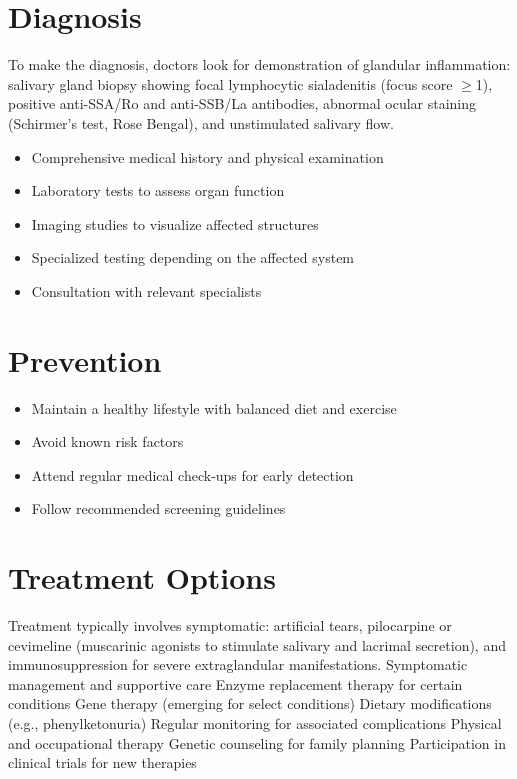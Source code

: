 \section{Diagnosis}
To make the diagnosis, doctors look for demonstration of glandular inflammation: salivary gland biopsy showing focal lymphocytic sialadenitis (focus score $\geq$1), positive anti-SSA/Ro and anti-SSB/La antibodies, abnormal ocular staining (Schirmer's test, Rose Bengal), and unstimulated salivary flow.

\begin{itemize}[noitemsep]
  \item Comprehensive medical history and physical examination
  \item Laboratory tests to assess organ function
  \item Imaging studies to visualize affected structures
  \item Specialized testing depending on the affected system
  \item Consultation with relevant specialists
\end{itemize}
\section{Prevention}
\begin{itemize}[noitemsep]
  \item Maintain a healthy lifestyle with balanced diet and exercise
  \item Avoid known risk factors
  \item Attend regular medical check-ups for early detection
  \item Follow recommended screening guidelines
\end{itemize}
\section{Treatment Options}
Treatment typically involves symptomatic: artificial tears, pilocarpine or cevimeline (muscarinic agonists to stimulate salivary and lacrimal secretion), and immunosuppression for severe extraglandular manifestations. Symptomatic management and supportive care Enzyme replacement therapy for certain conditions Gene therapy (emerging for select conditions) Dietary modifications (e.g., phenylketonuria) Regular monitoring for associated complications Physical and occupational therapy Genetic counseling for family planning Participation in clinical trials for new therapies

